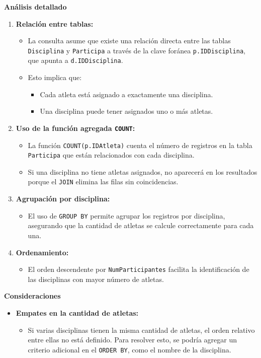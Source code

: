 \textbf{Análisis detallado}

\begin{enumerate}
   \item \textbf{Relación entre tablas:}
   \begin{itemize}
       \item La consulta asume que existe una relación directa entre las tablas \texttt{Disciplina} y \texttt{Participa} a través de la clave foránea \texttt{p.IDDisciplina}, que apunta a \texttt{d.IDDisciplina}.
       \item Esto implica que:
       \begin{itemize}
           \item Cada atleta está asignado a exactamente una disciplina.
           \item Una disciplina puede tener asignados uno o más atletas.
       \end{itemize}
   \end{itemize}
   
   \item \textbf{Uso de la función agregada \texttt{COUNT}:}
   \begin{itemize}
       \item La función \texttt{COUNT(p.IDAtleta)} cuenta el número de registros en la tabla \texttt{Participa} que están relacionados con cada disciplina.
       \item Si una disciplina no tiene atletas asignados, no aparecerá en los resultados porque el \texttt{JOIN} elimina las filas sin coincidencias.
   \end{itemize}
   
   \item \textbf{Agrupación por disciplina:}
   \begin{itemize}
       \item El uso de \texttt{GROUP BY} permite agrupar los registros por disciplina, asegurando que la cantidad de atletas se calcule correctamente para cada una.
   \end{itemize}
   
   \item \textbf{Ordenamiento:}
   \begin{itemize}
       \item El orden descendente por \texttt{NumParticipantes} facilita la identificación de las disciplinas con mayor número de atletas.
   \end{itemize}
\end{enumerate}

\textbf{Consideraciones}

\begin{itemize}
   \item \textbf{Empates en la cantidad de atletas:}
   \begin{itemize}
       \item Si varias disciplinas tienen la misma cantidad de atletas, el orden relativo entre ellas no está definido. Para resolver esto, se podría agregar un criterio adicional en el \texttt{ORDER BY}, como el nombre de la disciplina.
   \end{itemize}
\end{itemize}